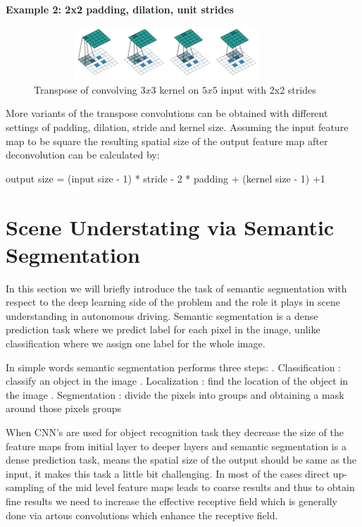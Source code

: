     \textbf{Example 2: 2x2 padding, dilation, unit strides}
     \begin{figure}[h]
    \centering
    \includegraphics[width=10cm, height =2cm]{images/transpose_case2.png}
    \caption{Transpose of convolving $3x3$ kernel on $5x5$ input with 2x2 strides \cite{https://doi.org/10.48550/arxiv.1603.07285}}
    \end{figure}
    
    More variants of the transpose convolutions can be obtained with different settings of padding, dilation, stride and kernel size. Assuming the input feature map to be square the resulting spatial size of the output feature map after deconvolution can be calculated by:
    
       \begin{center}\newline
       output size = (input size - 1) * stride - 2 * padding + (kernel size - 1) +1
   \end{center}
    

    \section{Scene Understating via Semantic Segmentation}
    In this section we will briefly introduce the task of semantic segmentation with respect to the deep learning side of the problem and the role it plays in scene understanding in autonomous driving. Semantic segmentation is a dense prediction task where we predict label for each pixel in the image, unlike classification where we assign one label for the whole image.
    
    In simple words semantic segmentation performs three steps: . Classification : classify an object in the image  . Localization : find the location of the object in the image . Segmentation : divide the pixels into groups and obtaining a mask around those pixels groups 
    
     When CNN's are used for object recognition task they decrease the size of the feature maps from initial layer to deeper layers and semantic segmentation is a dense prediction task, means the spatial size of the output should be same as the input, it makes this task a little bit challenging. In most of the cases direct up-sampling of the mid level feature maps leads to coarse results and thus to obtain fine results we need to increase the effective receptive field which is generally done via artous convolutions which enhance the receptive field. 
     
